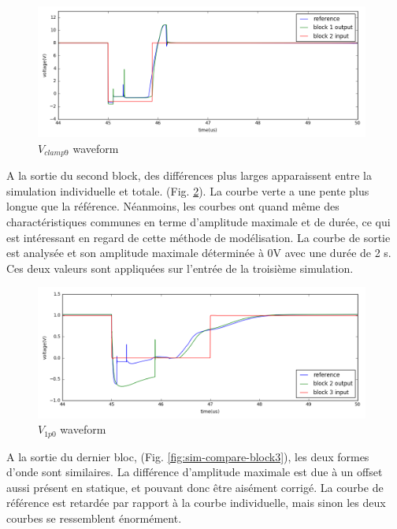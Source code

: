 \begin{figure}[!h]
  \centering
  \includegraphics[width=0.98\textwidth]{src/1/figures/simulation_comparison_block1.png}
  \caption{$V_{clamp9}$ waveform}
  \label{fig:sim-compare-block1}
\end{figure}

A la sortie du second block, des différences plus larges apparaissent entre la simulation individuelle et totale. (Fig. \ref{fig:sim-compare-block2}).
La courbe verte a une pente plus longue que la référence.
Néanmoins, les courbes ont quand même des charactéristiques communes en terme d'amplitude maximale et de durée, ce qui est intéressant en regard de cette méthode de modélisation.
La courbe de sortie est analysée et son amplitude maximale déterminée à 0V avec une durée de 2 \textmugreek{}s.
Ces deux valeurs sont appliquées sur l'entrée de la troisième simulation.

\begin{figure}[!h]
  \centering
  \includegraphics[width=0.98\textwidth]{src/1/figures/simulation_comparison_block2.png}
  \caption{$V_{1p0}$ waveform}
  \label{fig:sim-compare-block2}
\end{figure}

A la sortie du dernier bloc, (Fig. \ref{fig:sim-compare-block3}), les deux formes d'onde sont similaires.
La différence d'amplitude maximale est due à un offset aussi présent en statique, et pouvant donc être aisément corrigé.
La courbe de référence est retardée par rapport à la courbe individuelle, mais sinon les deux courbes se ressemblent énormément.

